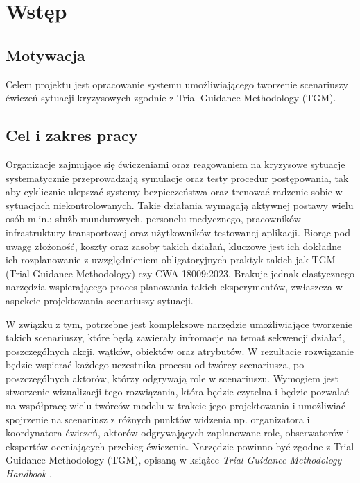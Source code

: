 
\chapter{Wstęp}

\section{Motywacja}
Celem projektu jest opracowanie systemu umożliwiającego tworzenie scenariuszy ćwiczeń sytuacji kryzysowych zgodnie z Trial Guidance Methodology (TGM).

\section{Cel i zakres pracy}
Organizacje zajmujące się ćwiczeniami oraz reagowaniem na kryzysowe sytuacje systematycznie przeprowadzają symulacje oraz testy procedur postępowania, tak aby cyklicznie ulepszać systemy bezpieczeństwa oraz trenować radzenie sobie w sytuacjach niekontrolowanych. Takie działania wymagają aktywnej postawy wielu osób m.in.: służb mundurowych, personelu medycznego, pracowników infrastruktury transportowej oraz użytkowników testowanej aplikacji.
Biorąc pod uwagę złożoność, koszty oraz zasoby takich działań, kluczowe jest ich dokładne ich rozplanowanie z uwzględnieniem obligatoryjnych praktyk takich jak TGM (Trial Guidance Methodology) czy CWA 18009:2023.
Brakuje jednak elastycznego narzędzia wspierającego proces planowania takich eksperymentów, zwłaszcza w
aspekcie projektowania scenariuszy sytuacji.

W związku z tym, potrzebne jest kompleksowe narzędzie umożliwiające tworzenie takich scenariuszy, które będą zawierały infromacje na temat sekwencji działań, poszczególnych akcji, wątków, obiektów oraz atrybutów. W rezultacie rozwiązanie będzie wspierać każdego uczestnika procesu od twórcy scenariusza, po poszczególnych aktorów, którzy odgrywają role w scenariuszu. Wymogiem jest stworzenie wizualizacji tego rozwiązania, która będzie czytelna i będzie pozwalać na współpracę wielu twórców modelu w trakcie jego projektowania i umożliwiać spojrzenie
na scenariusz z różnych punktów widzenia np. organizatora i koordynatora ćwiczeń, aktorów
odgrywających zaplanowane role, obserwatorów i ekspertów oceniających przebieg ćwiczenia.
Narzędzie powinno być zgodne z Trial Guidance Methodology (TGM), opisaną w książce \emph{Trial Guidance Methodology Handbook} \cite{tgmhandbook}. 

